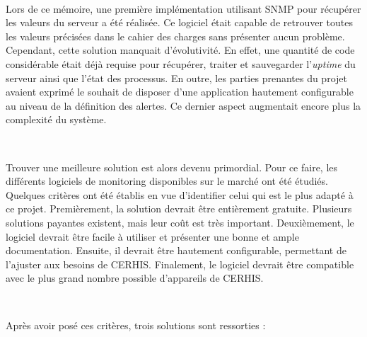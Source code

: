 ~

\noindent
Lors de ce mémoire, une première implémentation utilisant SNMP pour récupérer les valeurs du serveur a été réalisée. Ce logiciel était capable de retrouver toutes les valeurs précisées dans le cahier des charges sans présenter aucun problème. Cependant, cette solution manquait d'évolutivité. En effet, une quantité de code considérable était déjà requise pour récupérer, traiter et sauvegarder l'\textit{uptime} du serveur ainsi que l'état des processus. En outre, les parties prenantes du projet avaient exprimé le souhait de disposer d'une application hautement configurable au niveau de la définition des alertes. Ce dernier aspect augmentait encore plus la complexité du système.

~

\noindent
Trouver une meilleure solution est alors devenu primordial. Pour ce faire, les différents logiciels de monitoring disponibles sur le marché ont été étudiés. Quelques critères ont été établis en vue d'identifier celui qui est le plus adapté à ce projet. Premièrement, la solution devrait être entièrement gratuite. Plusieurs solutions payantes existent, mais leur coût est très important. Deuxièmement, le logiciel devrait être facile à utiliser et présenter une bonne et ample documentation. Ensuite, il devrait être hautement configurable, permettant de l'ajuster aux besoins de CERHIS. Finalement, le logiciel devrait être compatible avec le plus grand nombre possible d'appareils de CERHIS.

~

\noindent
Après avoir posé ces critères, trois solutions sont ressorties :

~

